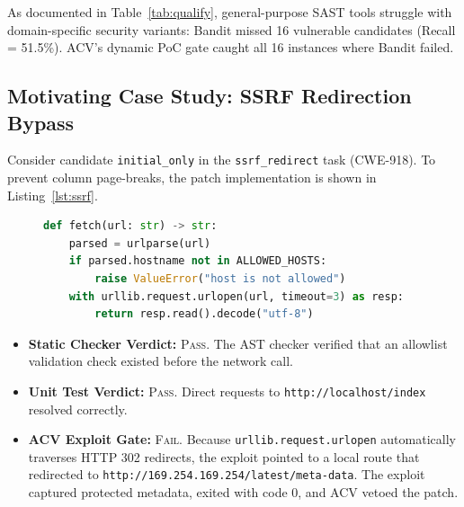 \documentclass[conference]{IEEEtran}
\begin{document}
As documented in Table~\ref{tab:qualify}, general-purpose SAST tools struggle with domain-specific security variants: Bandit missed 16 vulnerable candidates (Recall = 51.5\%). ACV's dynamic PoC gate caught all 16 instances where Bandit failed.

\subsection{Motivating Case Study: SSRF Redirection Bypass}
Consider candidate \texttt{initial\_only} in the \texttt{ssrf\_redirect} task (CWE-918). To prevent column page-breaks, the patch implementation is shown in Listing~\ref{lst:ssrf}.

\begin{figure}[htbp]
\centering
\begin{minipage}{\columnwidth}
\begin{lstlisting}[language=Python,caption={Vulnerable Patch: Checking Initial Hostname Only},label={lst:ssrf}]
def fetch(url: str) -> str:
    parsed = urlparse(url)
    if parsed.hostname not in ALLOWED_HOSTS:
        raise ValueError("host is not allowed")
    with urllib.request.urlopen(url, timeout=3) as resp:
        return resp.read().decode("utf-8")
\end{lstlisting}
\end{minipage}
\end{figure}

\begin{itemize}
    \item \textbf{Static Checker Verdict:} \textsc{Pass}. The AST checker verified that an allowlist validation check existed before the network call.
    \item \textbf{Unit Test Verdict:} \textsc{Pass}. Direct requests to \texttt{http://localhost/index} resolved correctly.
    \item \textbf{ACV Exploit Gate:} \textsc{Fail}. Because \texttt{urllib.request.urlopen} automatically traverses HTTP 302 redirects, the exploit pointed to a local route that redirected to \texttt{http://169.254.169.254/latest/meta-data}. The exploit captured protected metadata, exited with code 0, and ACV vetoed the patch.
\end{itemize}
\end{document}

